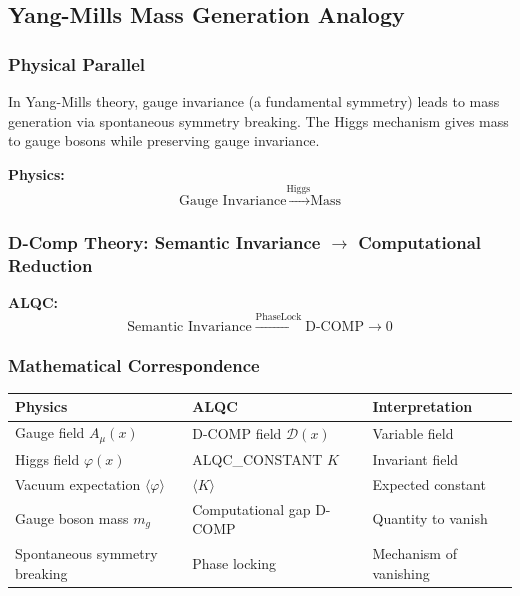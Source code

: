 \documentclass[11pt, letterpaper]{article}
\begin{document}
\subsection{Yang-Mills Mass Generation Analogy}

\subsubsection{Physical Parallel}

In Yang-Mills theory, gauge invariance (a fundamental symmetry) leads to mass generation via spontaneous symmetry breaking. The Higgs mechanism gives mass to gauge bosons while preserving gauge invariance.

\textbf{Physics:}
\begin{equation}
\text{Gauge Invariance} \xrightarrow{\text{Higgs}} \text{Mass}
\end{equation}

\subsubsection{\texorpdfstring{D-Comp Theory: Semantic Invariance $\rightarrow$ Computational Reduction}{D-Comp Theory: Semantic Invariance -- Computational Reduction}}

\textbf{ALQC:}
\begin{equation}
\text{Semantic Invariance} \xrightarrow{\text{PhaseLock}} \text{D-COMP} \rightarrow 0
\end{equation}

\subsubsection{Mathematical Correspondence}

\begin{table}[h]
\centering
\begin{tabular}{lll}
\toprule
Physics & ALQC & Interpretation \\
\midrule
Gauge field $A_\mu(x)$ & D-COMP field $\mathcal{D}(x)$ & Variable field \\
Higgs field $\varphi(x)$ & ALQC\_CONSTANT $K$ & Invariant field \\
Vacuum expectation $\langle\varphi\rangle$ & $\langle K \rangle$ & Expected constant \\
Gauge boson mass $m_g$ & Computational gap D-COMP & Quantity to vanish \\
Spontaneous symmetry breaking & Phase locking & Mechanism of vanishing \\
\bottomrule
\end{tabular}
\end{table}
\end{document}
